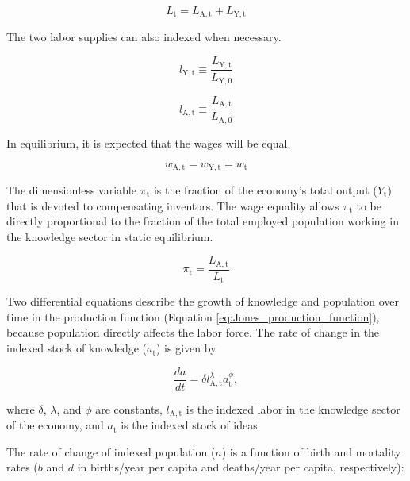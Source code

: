 \documentclass[letterpaper,12pt]{article}
\begin{document}
\begin{equation} \label{labor_supply}
	L_\mathrm{t} = L_\mathrm{A,t} + L_\mathrm{Y,t}
\end{equation}

The two labor supplies can also indexed when necessary.

\begin{equation}
	l_\mathrm{Y,t} \equiv \frac{L_\mathrm{Y,t}}{L_\mathrm{Y,0}}
\end{equation}

\begin{equation}
	l_\mathrm{A,t} \equiv \frac{L_\mathrm{A,t}}{L_\mathrm{A,0}}
\end{equation}

In equilibrium, it is expected that the wages will be equal.

\begin{equation} \label{eq:wage_equality}
	w_\mathrm{A,t} = w_\mathrm{Y,t} = w_\mathrm{t}
\end{equation}

The dimensionless variable $\pi_\mathrm{t}$ is the fraction of the economy's total output ($Y_\mathrm{t}$) that is devoted to compensating inventors. The wage equality allows $\pi_\mathrm{t}$ to be directly proportional to the fraction of the total employed population working in the knowledge sector in static equilibrium.

\begin{equation} \label{eq:pi}
	\pi_\mathrm{t} = \frac{L_\mathrm{A,t}}{L_\mathrm{t}}
\end{equation}

Two differential equations describe the growth of knowledge and population over time in the production function (Equation \ref{eq:Jones_production_function}), because population directly affects the labor force. The rate of change in the indexed stock of knowledge ($a_{\mathrm{t}}$) is given by

\begin{equation} \label{eq:da_dt}
	\frac{da}{dt} = \delta l_\mathrm{A,t}^\lambda a_\mathrm{t}^\phi,
\end{equation}

\noindent where $\delta$, $\lambda$, and $\phi$ are constants, $l_\mathrm{A,t}$ is the indexed labor in the knowledge sector of the economy, and $a_\mathrm{t}$ is the indexed stock of ideas.

The rate of change of indexed population ($n$) is a function of birth and mortality rates ($b$ and $d$ in births/year per capita and deaths/year per capita, respectively):
\end{document}
